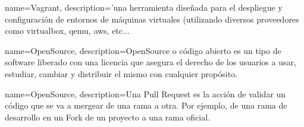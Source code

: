 {
    name=Vagrant,
    description={'una herramienta diseñada para el despliegue y configuración de entornos de máquinas virtuales (utilizando diversos proveedores como virtualbox, qemu, aws, etc...}
}





{
    name=OpenSource,
    description={OpenSource o código abierto es un tipo de software liberado con una licencia que asegura el derecho de los usuarios a usar, estudiar, cambiar y distribuir el mismo con cualquier propósito.}
}

{
    name=OpenSource,
    description={Una Pull Request es la acción de validar un código que se va a mergear de una rama a otra. Por ejemplo, de una rama de desarrollo en un Fork de un proyecto a una rama oficial.}
}



